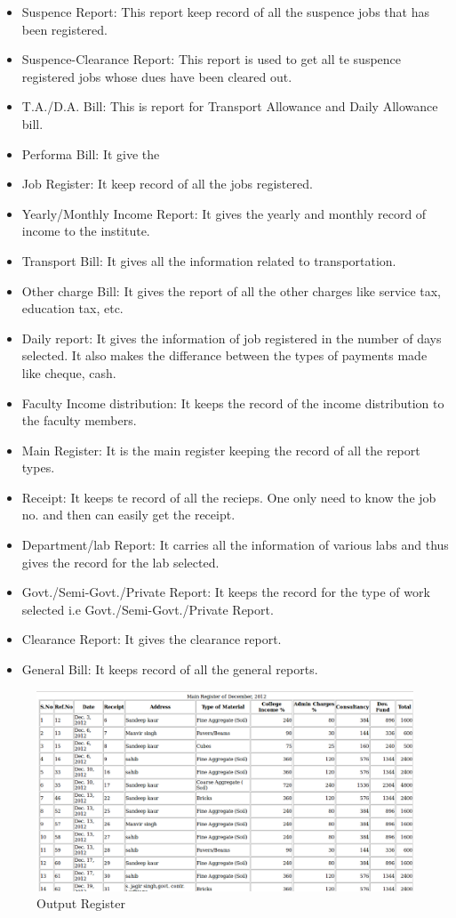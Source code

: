 \begin{itemize}
\item Suspence Report: This report keep record of all the suspence jobs that has been registered.
\item Suspence-Clearance Report: This report is used to get all te suspence registered jobs whose dues have been cleared out.
\item T.A./D.A. Bill: This is report for Transport Allowance and Daily Allowance bill.
\item Performa Bill: It give the 
\item Job Register: It keep record of all the jobs registered.
\item Yearly/Monthly Income Report: It gives the yearly and monthly record of income to the institute.
\item Transport Bill: It gives all the information related to transportation.
\item Other charge Bill: It gives the report of all the other charges like service tax, education tax, etc.
\item Daily report: It gives the information of job registered in  the number of days selected. It also makes the differance between the types of payments made like cheque, cash.
\item Faculty Income distribution: It keeps the record of the income distribution to the faculty members.
\item Main Register: It is the main register keeping the record of all the report types.
\item Receipt: It keeps te record of all the recieps. One only need to know the job no. and then can easily get the receipt.
\item Department/lab Report: It carries all the information of various labs and thus gives the record for the lab selected.
\item Govt./Semi-Govt./Private Report: It keeps the record for the type of work selected i.e Govt./Semi-Govt./Private Report.
\item Clearance Report: It gives the clearance report.
\item General Bill: It keeps record of all the general reports.
\end{itemize}

\begin{figure}[h]
\centering \includegraphics[scale=1.0]{reg1.png}
\caption{Output Register}
\end{figure}

